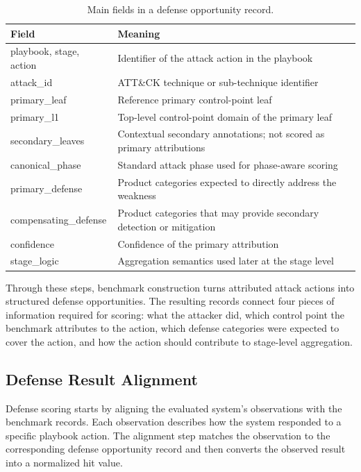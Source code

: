 \begin{table}[t]
\centering
\caption{Main fields in a defense opportunity record.}
\label{tab:opportunity-record-fields}
\begin{tabular}{p{}p{}}
\hline
Field & Meaning \\
\hline
playbook, stage, action & Identifier of the attack action in the playbook \\
attack\_id & ATT\&CK technique or sub-technique identifier \\
primary\_leaf & Reference primary control-point leaf \\
primary\_l1 & Top-level control-point domain of the primary leaf \\
secondary\_leaves & Contextual secondary annotations; not scored as primary attributions \\
canonical\_phase & Standard attack phase used for phase-aware scoring \\
primary\_defense & Product categories expected to directly address the weakness \\
compensating\_defense & Product categories that may provide secondary detection or mitigation \\
confidence & Confidence of the primary attribution \\
stage\_logic & Aggregation semantics used later at the stage level \\
\hline
\end{tabular}
\end{table}

Through these steps, benchmark construction turns attributed attack actions into structured defense opportunities. The resulting records connect four pieces of information required for scoring: what the attacker did, which control point the benchmark attributes to the action, which defense categories were expected to cover the action, and how the action should contribute to stage-level aggregation.

\subsection{Defense Result Alignment}
\label{subsec:defense-result-alignment}

Defense scoring starts by aligning the evaluated system's observations with the benchmark records. Each observation describes how the system responded to a specific playbook action. The alignment step matches the observation to the corresponding defense opportunity record and then converts the observed result into a normalized hit value.

